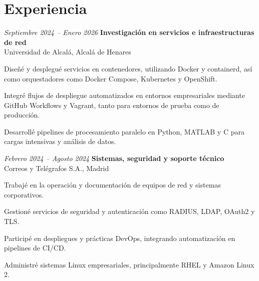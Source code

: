 \vspace{-7pt}

\section{Experiencia}

\begin{twocolentry}{\textit{Septiembre 2024 – Enero 2026}}
	\textbf{Investigación en servicios e infraestructuras de red} \\
	Universidad de Alcalá, Alcalá de Henares
\end{twocolentry}
\begin{onecolentry}
	\begin{highlights}
		\item Diseñé y desplegué servicios en contenedores, utilizando Docker y containerd, así como orquestadores como Docker Compose, Kubernetes y OpenShift.
		\item Integré flujos de despliegue automatizados en entornos empresariales mediante GitHub Workflows y Vagrant, tanto para entornos de prueba como de producción.
		\item Desarrollé pipelines de procesamiento paralelo en Python, MATLAB y C para cargas intensivas y análisis de datos.
	\end{highlights}
\end{onecolentry}

\vspace{0.2 cm}

\begin{twocolentry}{\textit{Febrero 2024 – Agosto 2024}}
	\textbf{Sistemas, seguridad y soporte técnico} \\
	Correos y Telégrafos S.A., Madrid
\end{twocolentry}
\begin{onecolentry}
	\begin{highlights}
		\item Trabajé en la operación y documentación de equipos de red y sistemas corporativos.
		\item Gestioné servicios de seguridad y autenticación como RADIUS, LDAP, OAuth2 y TLS.
		\item Participé en despliegues y prácticas DevOps, integrando automatización en pipelines de CI/CD.
		\item Administré sistemas Linux empresariales, principalmente RHEL y Amazon Linux 2.
	\end{highlights}
\end{onecolentry}

